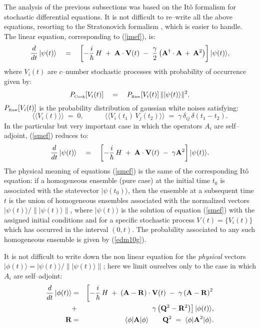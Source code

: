 \documentclass[12pt]{article}
\newcommand{\llangle}{\langle\!\langle}
\newcommand{\rrangle}{\rangle\!\rangle}
\begin{document}
The analysis of the previous subsections was based on the It\^o
formalism for stochastic differential equations. It is not
difficult to re--write all the above equations, resorting to the
Stratonovich formalism \cite{arn}, which is easier to handle. The
linear equation, corresponding to (\ref{imef}), is:
\begin{equation} \label{smef}
\frac{d}{dt}\, |\psi(t)\rangle \quad = \quad \left[
-\frac{i}{\hbar}\, H \; + \; {\bf A}\cdot {\bf V}(t) \; - \;
\frac{\gamma}{2} \left( {\bf A}^{\dagger}\cdot {\bf A} \, + \,
{\bf A}^{2}\right) \right] |\psi(t)\rangle,
\end{equation}
where $V_{i}(t)$ are $c$--number stochastic processes with
probability of occurrence given by:
\begin{equation} \label{edm10g}
P_{\makebox{\tiny Cook}}[V_{i}(t)] \quad = \quad P_{\makebox{\tiny
Raw}}[V_{i}(t)]\, \||\psi(t)\rangle\|^{2}.
\end{equation}
$P_{\makebox{\tiny Raw}}[V_{i}(t)]$ is the probability
distribution of gaussian white noises satisfying:
\begin{equation} \label{probwn}
\llangle V_{i}(t) \rrangle \; = \; 0, \qquad \quad \llangle
V_{i}(t_{1})\, V_{j}(t_{2}) \rrangle \; = \; \gamma\,\delta_{ij}\,
\delta(t_{1} - t_{2}).
\end{equation}
In the particular but very important case in which the operators
$A_{i}$ are self--adjoint, (\ref{smef}) reduces to:
\begin{equation} \label{smefsa}
\frac{d}{dt}\, |\psi(t)\rangle \quad = \quad \left[
-\frac{i}{\hbar}\, H \; + \; {\bf A}\cdot {\bf V}(t) \; - \;
\gamma {\bf A}^{2}\right] |\psi(t)\rangle.
\end{equation}
The physical meaning of equations (\ref{smef}) is the same of the
corresponding It\^o equation: if a homogeneous ensemble (pure
case) at the initial time $t_{0}$ is associated with the
statevector $|\psi(t_{0})\rangle$, then the ensemble at a
subsequent time $t$ is the union of homogeneous ensembles
associated with the normalized vectors $|\psi(t)\rangle/\|
|\psi(t)\rangle \|$, where $|\psi(t)\rangle$ is the solution of
equation (\ref{smef}) with the assigned initial conditions and for
a specific stochastic process $V(t) = \{ V_{i}(t) \}$ which has
occurred in the interval $(0,t)$. The probability associated to
any such homogeneous ensemble is given by (\ref{edm10g}).

It is not difficult to write down the non linear equation for the
{\it physical} vectors $|\phi(t)\rangle = |\psi(t)\rangle/\|
|\psi(t)\rangle \|$; here we limit ourselves only to the case in
which $A_{i}$ are self--adjoint:
\begin{eqnarray} \label{qelaoj}
\frac{d}{dt}\, |\phi(t)\rangle & = & \left[ -\frac{i}{\hbar}\, H\;
+ \; \left( {\bf A} - {\bf R} \right)\cdot {\bf V}(t) \; - \;
\gamma \left( {\bf A} - {\bf R} \right)^{2} \right. \nonumber
\\
& + & \left. \gamma \left( {\bf Q}^{2} - {\bf R}^{2} \right)
\right] |\phi(t)\rangle,
\\
{\bf R} & = & \langle\phi| {\bf A} |\phi\rangle \qquad {\bf Q}^{2}
\; = \; \langle\phi| {\bf A}^{2} |\phi\rangle \nonumber.
\end{eqnarray}
\end{document}
